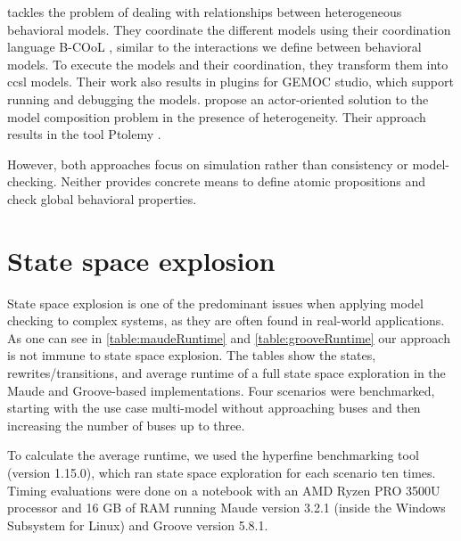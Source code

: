 \documentclass{jot}
\begin{document}
\cite{deantoniModelingBehavioralSemantics2016} tackles the problem of dealing with relationships between heterogeneous behavioral models.
They coordinate the different models using their coordination language B-COoL \cite{varalarsenBCoolBehavioralCoordination2016}, similar to the interactions we define between behavioral models.
To execute the models and their coordination, they transform them into \gls*{ccsl} models.  
Their work also results in plugins for GEMOC studio, which support running and debugging the models.
\cite{ekerTamingHeterogeneityPtolemy2003, leeDisciplinedHeterogeneousModeling2010} propose an actor-oriented solution to the model composition problem in the presence of heterogeneity.
Their approach results in the tool Ptolemy \cite{ptolemaeusSystemDesignModeling2014}.

However, both approaches focus on simulation rather than consistency or model-checking.
Neither provides concrete means to define atomic propositions and check global behavioral properties.

\section{State space explosion} \label{sec:state_space_explosion}
State space explosion is one of the predominant issues when applying model checking to complex systems, as they are often found in real-world applications.
As one can see in \autoref{table:maudeRuntime} and \autoref{table:grooveRuntime} our approach is not immune to state space explosion.
The tables show the states, rewrites/transitions, and average runtime of a full state space exploration in the Maude and Groove-based implementations.
Four scenarios were benchmarked, starting with the use case multi-model without approaching buses and then increasing the number of buses up to three.

To calculate the average runtime, we used the hyperfine benchmarking tool \cite{peterHyperfine2022} (version 1.15.0), which ran state space exploration for each scenario ten times.
Timing evaluations were done on a notebook with an AMD Ryzen PRO 3500U processor and 16 GB of RAM running Maude version 3.2.1 (inside the Windows Subsystem for Linux) and Groove version 5.8.1.
\end{document}
